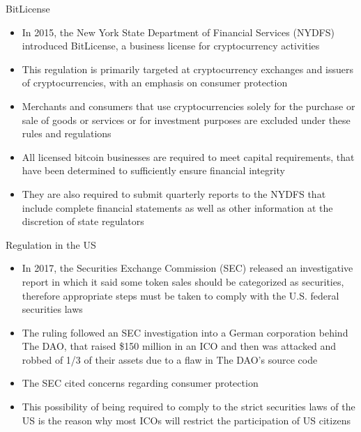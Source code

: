 \documentclass[10pt]{beamer}
\begin{document}

\begin{frame}{BitLicense}
	\begin{itemize}
		\item In 2015, the New York State Department of Financial Services (NYDFS) introduced BitLicense, a business license for cryptocurrency activities
		\item This regulation is primarily targeted at cryptocurrency exchanges and issuers of cryptocurrencies, with an emphasis on consumer protection
		\item Merchants and consumers that use cryptocurrencies solely for the purchase or sale of goods or services or for investment purposes are excluded under these rules and regulations
		\item All licensed bitcoin businesses are required to meet capital requirements, that have been determined to sufficiently ensure financial integrity
		\item They are also required to submit quarterly reports to the NYDFS that include complete financial statements as well as other information at the discretion of state regulators
	\end{itemize}
\end{frame}


\begin{frame}{Regulation in the US}
	\begin{itemize}
		\item In 2017, the Securities Exchange Commission (SEC) released an investigative report in which it said some token sales should be categorized as securities, therefore appropriate steps must be taken to comply with the U.S. federal securities laws
		\item The ruling followed an SEC investigation into a German corporation behind The DAO, that raised \$150 million in an ICO and then was attacked and robbed of 1/3 of their assets due to a flaw in The DAO's source code
		\item The SEC cited concerns regarding consumer protection
		\item This possibility of being required to comply to the strict securities laws of the US is the reason why most ICOs will restrict the participation of US citizens
	\end{itemize}
\end{frame}
\end{document}
